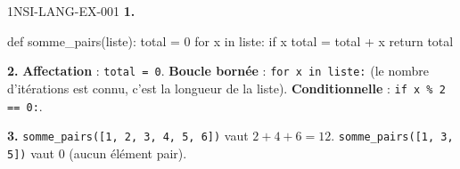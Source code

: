 \begin{corrige}{1NSI-LANG-EX-001}
\textbf{1.}
\begin{python}
def somme_pairs(liste):
    total = 0
    for x in liste:
        if x %
            total = total + x
    return total
\end{python}

\textbf{2.} \textbf{Affectation} : \lstinline{total = 0}. \textbf{Boucle bornée} :
\lstinline{for x in liste:} (le nombre d'itérations est connu, c'est la longueur de la
liste). \textbf{Conditionnelle} : \lstinline{if x % 2 == 0:}.

\textbf{3.} \lstinline{somme_pairs([1, 2, 3, 4, 5, 6])} vaut $2+4+6=12$.
\lstinline{somme_pairs([1, 3, 5])} vaut $0$ (aucun élément pair).
\end{corrige}
